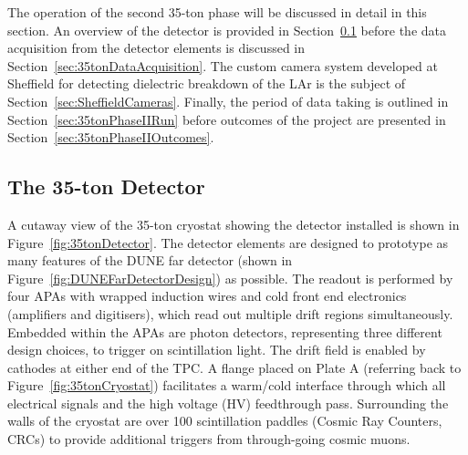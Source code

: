 The operation of the second 35-ton phase will be discussed in detail in this section.  An overview of the detector is provided in Section~\ref{sec:35tonDetector} before the data acquisition from the detector elements is discussed in Section~\ref{sec:35tonDataAcquisition}.  The custom camera system developed at Sheffield for detecting dielectric breakdown of the LAr is the subject of Section~\ref{sec:SheffieldCameras}.  Finally, the period of data taking is outlined in Section~\ref{sec:35tonPhaseIIRun} before outcomes of the project are presented in Section~\ref{sec:35tonPhaseIIOutcomes}.

\subsection{The 35-ton Detector}\label{sec:35tonDetector}

A cutaway view of the 35-ton cryostat showing the detector installed is shown in Figure~\ref{fig:35tonDetector}.  The detector elements are designed to prototype as many features of the DUNE far detector (shown in Figure~\ref{fig:DUNEFarDetectorDesign}) as possible.  The readout is performed by four APAs with wrapped induction wires and cold front end electronics (amplifiers and digitisers), which read out multiple drift regions simultaneously.  Embedded within the APAs are photon detectors, representing three different design choices, to trigger on scintillation light.  The drift field is enabled by cathodes at either end of the TPC.  A flange placed on Plate A (referring back to Figure~\ref{fig:35tonCryostat}) facilitates a warm/cold interface through which all electrical signals and the high voltage (HV) feedthrough pass.  Surrounding the walls of the cryostat are over 100 scintillation paddles (Cosmic Ray Counters, CRCs) to provide additional triggers from through-going cosmic muons.


